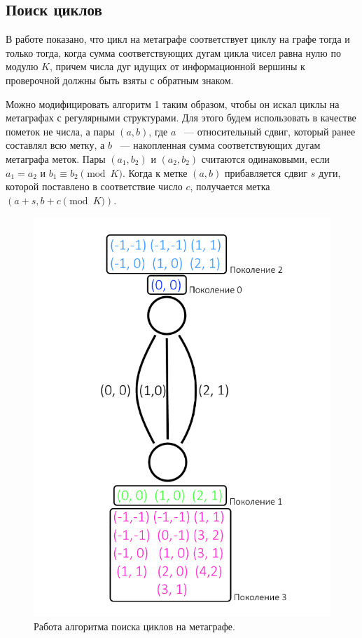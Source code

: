 \documentclass[14pt]{mmcs-article}
\begin{document}
\subsection{Поиск циклов}

В работе \cite{metagraphs} показано, что цикл на метаграфе соответствует циклу на графе тогда и только тогда, когда сумма соответствующих дугам цикла чисел равна нулю по модулю $K$, причем числа дуг идущих от информационной вершины к проверочной должны быть взяты с обратным знаком.

Можно модифицировать алгоритм 1 таким образом, чтобы он искал циклы на метаграфах с регулярными структурами. Для этого будем использовать в качестве пометок не числа, а пары $(a, b)$, где $a$ ~--- относительный сдвиг, который ранее составлял всю метку, а $b$ ~--- накопленная сумма соответствующих дугам метаграфа меток. Пары $(a_1, b_2)$ и $(a_2, b_2)$ считаются одинаковыми, если $a_1 = a_2$ и $b_1 \equiv b_2 \pmod K$. Когда к метке $(a, b)$ прибавляется сдвиг $s$ дуги, которой поставлено в соответствие число $c$, получается метка $(a + s, b + c \pmod K)$.

\begin{figure}[H]
  \centering
  \includegraphics[scale=0.4]{Fig_9.png}
  \caption{ Работа алгоритма поиска циклов на метаграфе. }
  \label{metagraph:2}
\end{figure}
\end{document}
